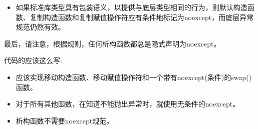 \begin{itemize}
	\item 如果标准库类型具有包装语义，以提供与底层类型相同的行为，则默认构造函数、复制构造函数和复制赋值操作符应有条件地标记为noexcept，而底层异常规范仍然有效。
\end{itemize}

最后，请注意，根据规则，任何析构函数都总是隐式声明为noexcept。\par

代码的应该这么写:\par

\begin{itemize}
	\item 应该实现移动构造函数、移动赋值操作符和一个带有noexcept(条件)的swap()函数。
	\item 对于所有其他函数，在知道不能抛出异常时，就使用无条件的noexcept。
	\item 析构函数不需要noexcept规范。
\end{itemize}








